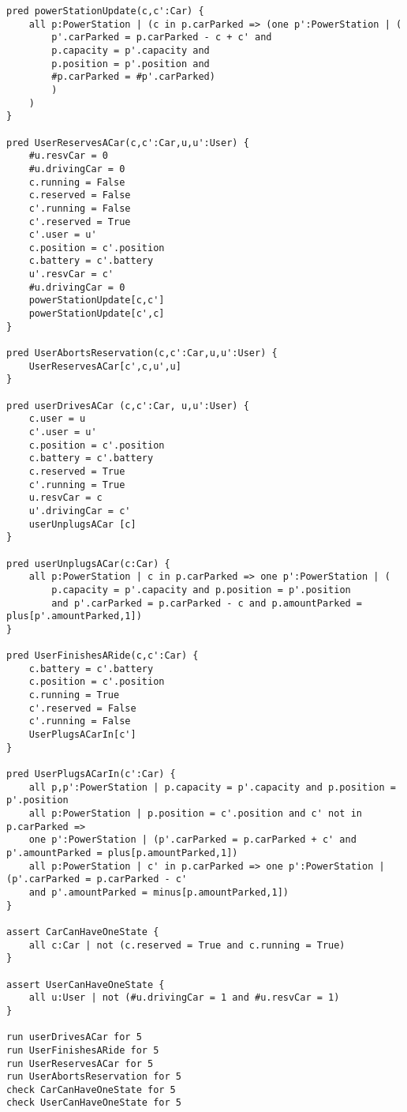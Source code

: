 \begin{verbatim}
pred powerStationUpdate(c,c':Car) {
	all p:PowerStation | (c in p.carParked => (one p':PowerStation | (
		p'.carParked = p.carParked - c + c' and
		p.capacity = p'.capacity and
		p.position = p'.position and
		#p.carParked = #p'.carParked)
		)
	)
}

pred UserReservesACar(c,c':Car,u,u':User) {
	#u.resvCar = 0
	#u.drivingCar = 0
	c.running = False
	c.reserved = False
	c'.running = False
	c'.reserved = True
	c'.user = u'
	c.position = c'.position
	c.battery = c'.battery
	u'.resvCar = c'
	#u.drivingCar = 0
	powerStationUpdate[c,c']
	powerStationUpdate[c',c]
}

pred UserAbortsReservation(c,c':Car,u,u':User) {
	UserReservesACar[c',c,u',u]
}

pred userDrivesACar (c,c':Car, u,u':User) {
	c.user = u
	c'.user = u'
	c.position = c'.position
	c.battery = c'.battery
	c.reserved = True
	c'.running = True
	u.resvCar = c
	u'.drivingCar = c'
	userUnplugsACar [c]
}

pred userUnplugsACar(c:Car) {
	all p:PowerStation | c in p.carParked => one p':PowerStation | (
		p.capacity = p'.capacity and p.position = p'.position 
		and p'.carParked = p.carParked - c and p.amountParked = plus[p'.amountParked,1])
}

pred UserFinishesARide(c,c':Car) {
	c.battery = c'.battery
	c.position = c'.position
	c.running = True
	c'.reserved = False
	c'.running = False
	UserPlugsACarIn[c']
}

pred UserPlugsACarIn(c':Car) {
	all p,p':PowerStation | p.capacity = p'.capacity and p.position = p'.position
	all p:PowerStation | p.position = c'.position and c' not in p.carParked => 
	one p':PowerStation | (p'.carParked = p.carParked + c' and p'.amountParked = plus[p.amountParked,1])
	all p:PowerStation | c' in p.carParked => one p':PowerStation | (p'.carParked = p.carParked - c'
	and p'.amountParked = minus[p.amountParked,1])
}

assert CarCanHaveOneState {
	all c:Car | not (c.reserved = True and c.running = True)
}

assert UserCanHaveOneState {
	all u:User | not (#u.drivingCar = 1 and #u.resvCar = 1)
}

run userDrivesACar for 5
run UserFinishesARide for 5
run UserReservesACar for 5
run UserAbortsReservation for 5
check CarCanHaveOneState for 5
check UserCanHaveOneState for 5
\end{verbatim}